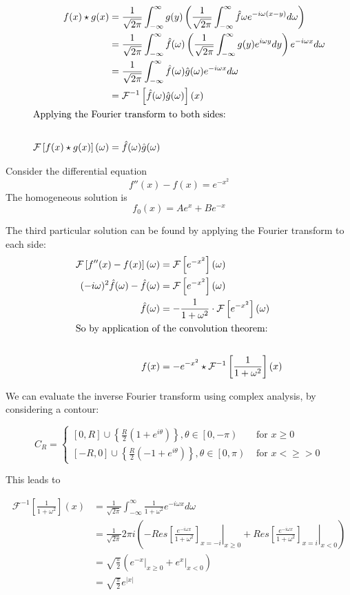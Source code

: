 \documentclass{../../physics_notes}
\newcommand{\intfty}{\int_{-\infty}^\infty}
\newcommand{\F}[2]{\mathcal{F}\left[#1\right](#2)}
\renewcommand{\Finv}[2]{\mathcal{F}^{-1}\left[#1\right](#2)}
\newcommand{\intF}[3]{\frac{1}{\sqrt{2\pi}}\intfty #1 e^{i#3#2}d#2}
\newcommand{\intFinv}[3]{\frac{1}{\sqrt{2\pi}}\intfty #1 e^{-i#3#2}d#3}
\begin{document}
\begin{align*}
f(x) \star g(x) &= \frac{1}{\sqrt{2\pi}} \intfty g(y) \left(\intFinv{\hat{f}{\omega}}{(x-y)}{\omega}\right) \\
&= \intFinv{\hat{f}(\omega) \left(\intF{g(y)}{y}{\omega}\right)}{x}{\omega} \\
&= \intFinv{\hat{f}(\omega)\hat{g}(\omega)}{x}{\omega} \\
&= \Finv{\hat{f}(\omega)\hat{g}(\omega)}{x} \\
\intertext{Applying the Fourier transform to both sides:} \\
\F{f(x) \star g(x)}{\omega} &= \hat{f}(\omega)\hat{g}(\omega)
\end{align*}

\begin{example}{}
Consider the differential equation \[f''(x) - f(x) = e^{-x^2}\] The homogeneous solution is \[f_0(x) = Ae^x + Be^{-x}\]

The third particular solution can be found by applying the Fourier transform to each side:
\begin{align*}
\F{f''(x) - f(x)}{\omega} &= \F{e^{-x^2}}{\omega} \\
(-i\omega)^2\hat{f}(\omega) - \hat{f}(\omega) &= \F{e^{-x^2}}{\omega} \\
\hat{f}(\omega) &= -\frac{1}{1+\omega^2}\cdot\F{e^{-x^2}}{\omega} \\
\intertext{So by application of the convolution theorem:} \\
f(x) &= -e^{-x^2} \star \Finv{\frac{1}{1+\omega^2}}{x}
\end{align*}

We can evaluate the inverse Fourier transform using complex analysis, by considering a contour:

\begin{equation*}
C_R = \begin{cases}[0,R]\cup\left\{\frac{R}{2}\left(1 + e^{i\theta}\right)\right\},\theta\in\left[0,-\pi\right) & \text{ for } x \geq 0 \\ [-R,0]\cup\left\{\frac{R}{2}\left(-1 + e^{i\theta}\right)\right\},\theta\in\left[0,\pi\right) & \text{ for } x <\geq> 0 \end{cases}
\end{equation*}

This leads to

\begin{align*}
\Finv{\frac{1}{1+\omega^2}}{x} &= \intFinv{\frac{1}{1+\omega^2}}{x}{\omega} \\
&= \frac{1}{\sqrt{2\pi}} 2\pi i\left(\left.-Res\left[\frac{e^{-i\omega x}}{1+\omega^2}\right]_{x=-i}\right|_{x\geq 0} + \left.Res\left[\frac{e^{-i\omega x}}{1+\omega^2}\right]_{x=i}\right|_{x < 0} \right) \\
&= \sqrt{\frac{\pi}{2}}\left(\left.e^{-x}\right|_{x\geq 0} + \left. e^x\right|_{x<0}\right) \\
&= \sqrt{\frac{\pi}{2}}e^{|x|}
\end{align*}


\end{example}
\end{document}
